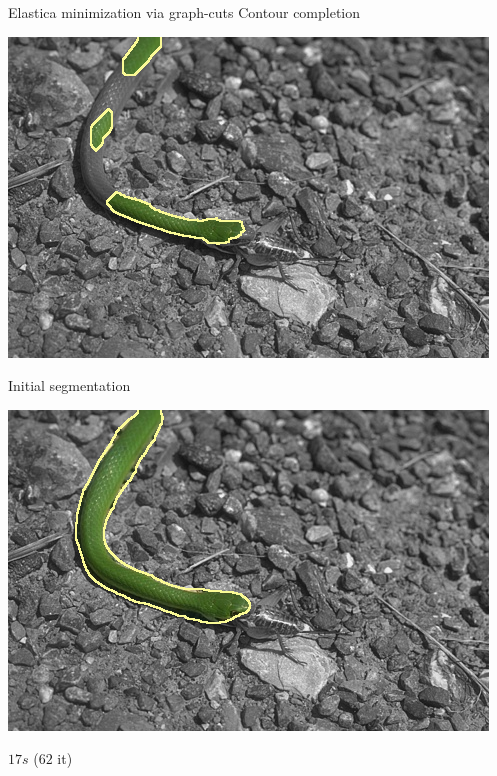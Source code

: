 \begin{frame}
{Elastica minimization via graph-cuts}
{Contour completion}

\begin{minipage}[t][0.47\textheight]{1\textwidth}
\center
\includegraphics[scale=0.28]{figures/graphcut/contour-completion/green-snake/gc-seg.png}

Initial segmentation

\end{minipage}
\vspace{1em}
\begin{minipage}[t][0.47\textheight]{1\textwidth}
\center
\includegraphics[scale=0.28]{figures/graphcut/contour-completion/green-snake/corrected-seg.png}

$17s$ ($62$ it)

\end{minipage}


\end{frame}
